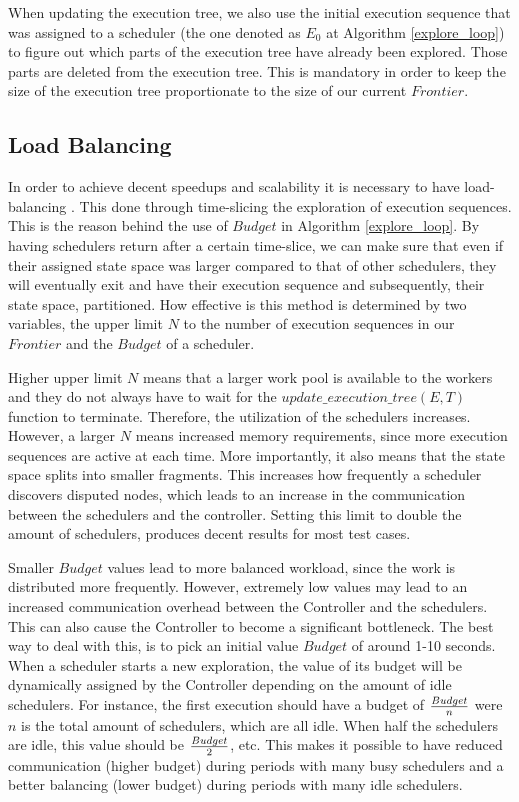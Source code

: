 When updating the execution tree, we also use the initial execution sequence that was assigned to a scheduler
(the one denoted as $E_0$ at Algorithm \ref{explore_loop}) to figure out which parts of the execution tree have
already been explored. Those parts are deleted from the execution tree. 
This is mandatory in order to keep the size of the execution tree proportionate to the size of our current $Frontier$.


\subsection{Load Balancing}

In order to achieve decent speedups and scalability it is necessary to have load-balancing \cite{Simsa2012ScalableDP}.
This done through time-slicing the exploration of execution sequences. This is the reason
behind the use of $Budget$ in Algorithm \ref{explore_loop}. By having schedulers return after a certain time-slice,
we can make sure that even if their assigned state space was larger compared to that of other schedulers, they will
eventually exit and have their execution sequence and subsequently, their state space, partitioned. How effective
is this method is determined by two variables, the upper limit $N$ to the number of execution sequences in our
$Frontier$ and the $Budget$ of a scheduler.

Higher upper limit $N$ means that a larger work pool is available to the workers and they do not always have to wait
for the $update\_execution\_tree(E, T)$ function to terminate. Therefore, the utilization of the schedulers
increases.
However, a larger $N$ means increased memory requirements, since more execution sequences are active at each time. More importantly, 
it also means that the state space splits into smaller fragments. This increases how frequently a scheduler discovers disputed nodes, which
leads to an increase in the communication between the schedulers and the controller.
Setting this limit to double the amount of schedulers, produces decent results for most test cases\cite{Simsa2012ScalableDP}.

Smaller $Budget$ values lead to more balanced workload, since the work is distributed more frequently. However,
extremely low values may lead to an increased communication overhead between the Controller and the schedulers.
This can also cause the Controller to become a significant bottleneck. The best way to deal with this,
is to pick an initial value $Budget$ of around 1-10 seconds. When a scheduler starts a new exploration,
the value of its budget will be dynamically assigned by the Controller depending on the amount of
idle schedulers. For instance, the first execution should have a budget of $Budget \over n$ were $n$ is the total amount of
schedulers, which are all idle. When half the schedulers are idle, this value should be $Budget \over 2$, etc. This makes it possible to have
reduced communication (higher budget) during periods with many busy schedulers and a better balancing
(lower budget) during periods with many idle schedulers.

